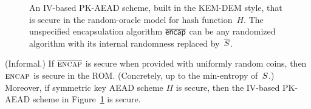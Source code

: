 \begin{figure}
\begin{center}

\medskip
\hspace*{.5ex} 
\caption{An IV-based PK-AEAD scheme, built in the KEM-DEM style, that is secure in the random-oracle model for hash function~$H$. The unspecified encapsulation algorithm $\overline{\mathsf{encap}}$ can be any randomized algorithm with its internal randomness replaced by~$\overline{S}$.
}
\label{fig:ro-kem-dem-construction}
\end{center}
\end{figure}

\begin{theorem}(Informal.) \rm If $\overline{\textsc{encap}}$ is secure when provided with uniformly random coins, then $\textsc{encap}$ is secure in the ROM.  (Concretely, up to the min-entropy of~$S$.)  Moreover, if symmetric key AEAD scheme $\Pi$ is secure, then the IV-based PK-AEAD scheme in Figure~\ref{fig:ro-kem-dem-construction} is secure.
\end{theorem}

